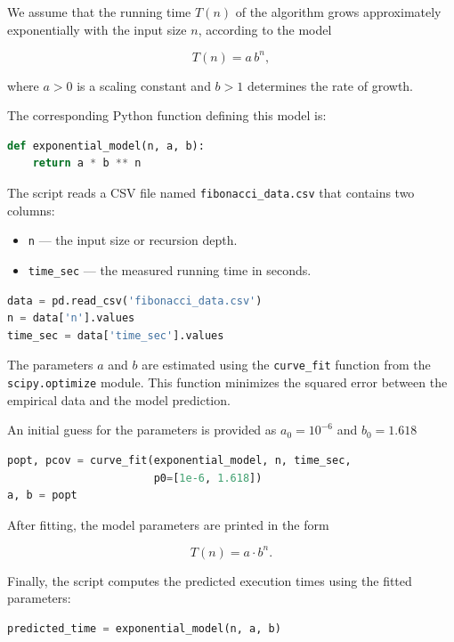 \documentclass{article}
\begin{document}
We assume that the running time $T(n)$ of the algorithm grows approximately exponentially with the input size $n$, according to the model

\[
	T(n) = a \, b^n,
\]

where $a > 0$ is a scaling constant and $b > 1$ determines the rate of growth.

The corresponding Python function defining this model is:

\begin{lstlisting}[language=Python]
def exponential_model(n, a, b):
    return a * b ** n
\end{lstlisting}

The script reads a CSV file named \texttt{fibonacci\_data.csv} that contains two columns:

\begin{itemize}
	\item \texttt{n} — the input size or recursion depth.
	\item \texttt{time\_sec} — the measured running time in seconds.
\end{itemize}

\begin{lstlisting}[language=Python]
data = pd.read_csv('fibonacci_data.csv')
n = data['n'].values
time_sec = data['time_sec'].values
\end{lstlisting}

The parameters $a$ and $b$ are estimated using the \texttt{curve\_fit} function from the \texttt{scipy.optimize} module. This function minimizes the squared error between the empirical data and the model prediction.

An initial guess for the parameters is provided as $a_0 = 10^{-6}$ and $b_0 = 1.618$

\begin{lstlisting}[language=Python]
popt, pcov = curve_fit(exponential_model, n, time_sec,
                       p0=[1e-6, 1.618])
a, b = popt
\end{lstlisting}

After fitting, the model parameters are printed in the form

\[
	T(n) = a \cdot b^n.
\]

Finally, the script computes the predicted execution times using the fitted parameters:

\begin{lstlisting}[language=Python]
predicted_time = exponential_model(n, a, b)
\end{lstlisting}
\end{document}

